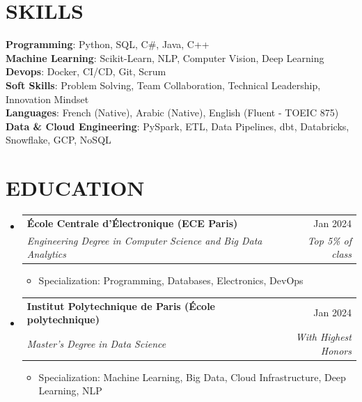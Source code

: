 \documentclass[11pt,a4paper]{article}
\makeatletter
\newcommand{\resumeItem}[1]{
  \item\footnotesize{
    {#1 \vspace{-1pt}}
  }
}
\newcommand{\resumeSubheading}[4]{
  \vspace{2pt}\item
    \begin{tabular*}{\textwidth}[t]{l@{\extracolsep{\fill}}r}
      {\footnotesize\textbf{#1}} & {\footnotesize#2} \\
      {\footnotesize\textit{#3}} & {\footnotesize\textit{#4}} \\
    \end{tabular*}\vspace{2pt}
}
\newcommand{\resumeSubHeadingListStart}{\begin{itemize}[leftmargin=0in, label={}]}
\newcommand{\resumeSubHeadingListEnd}{\end{itemize}}
\newcommand{\resumeItemListStart}{\begin{itemize}[label={\textbullet}]}
\newcommand{\resumeItemListEnd}{\end{itemize}\vspace{0pt}}
\makeatother
\begin{document}
\section{SKILLS}
\begin{itemize}[leftmargin=0in, label={}]
\footnotesize{\item{
{\footnotesize\textbf{Programming}:} {\footnotesize Python, SQL, C{\#}, Java, C++} \\
\vspace{3pt}
{\footnotesize\textbf{Machine Learning}:} {\footnotesize Scikit-Learn, NLP, Computer Vision, Deep Learning} \\
\vspace{3pt}
{\footnotesize\textbf{Devops}:} {\footnotesize Docker, CI/CD, Git, Scrum} \\
\vspace{3pt}
{\footnotesize\textbf{Soft Skills}:} {\footnotesize Problem Solving, Team Collaboration, Technical Leadership, Innovation Mindset} \\
\vspace{3pt}
{\footnotesize\textbf{Languages}:} {\footnotesize French (Native), Arabic (Native), English (Fluent - TOEIC 875)} \\
\vspace{3pt}
{\footnotesize\textbf{Data \& Cloud Engineering}:} {\footnotesize PySpark, ETL, Data Pipelines, dbt, Databricks, Snowflake, GCP, NoSQL}
}
}
\end{itemize}

\section{EDUCATION}
\resumeSubHeadingListStart
    \resumeSubheading
      {École Centrale d'Électronique (ECE Paris)}
      {Jan 2024}
      {Engineering Degree in Computer Science and Big Data Analytics}
      {Top 5\% of class}
      \resumeItemListStart
        \resumeItem{Specialization: Programming, Databases, Electronics, DevOps}
      \resumeItemListEnd
    \resumeSubheading
      {Institut Polytechnique de Paris (École polytechnique)}
      {Jan 2024}
      {Master's Degree in Data Science}
      {With Highest Honors}
      \resumeItemListStart
        \resumeItem{Specialization: Machine Learning, Big Data, Cloud Infrastructure, Deep Learning, NLP}
      \resumeItemListEnd
  \resumeSubHeadingListEnd
\end{document}
